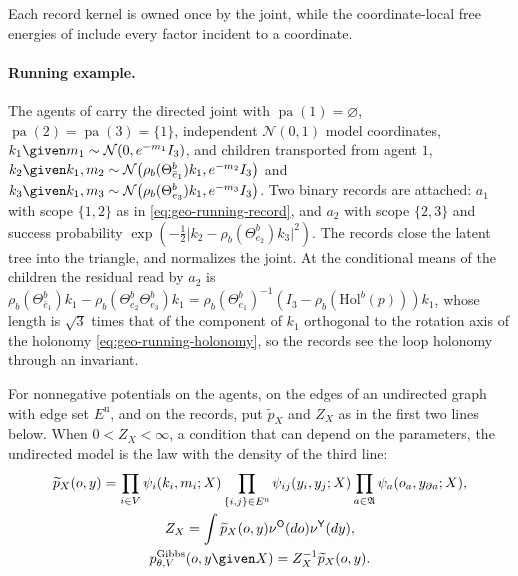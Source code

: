 Each record kernel is owned once by the joint, while the coordinate-local free energies of 
include every factor incident to a coordinate.

\paragraph{Running example.}
The agents of  carry the directed joint with
$\operatorname{pa}(1)=\varnothing$, $\operatorname{pa}(2)=\operatorname{pa}(3)=\{1\}$, independent
$\mathcal N(0,1)$ model coordinates, $k_1\given m_1\sim\mathcal N(0,e^{-m_1}I_3)$, and children
transported from agent $1$,
$k_2\given k_1,m_2\sim\mathcal N\bigl(\rho_b(\Theta^b_{\bar e_1})k_1,e^{-m_2}I_3\bigr)$ and
$k_3\given k_1,m_3\sim\mathcal N\bigl(\rho_b(\Theta^b_{e_3})k_1,e^{-m_3}I_3\bigr)$. Two binary records are
attached: $a_1$ with scope $\{1,2\}$ as in \eqref{eq:geo-running-record}, and $a_2$ with scope $\{2,3\}$
and success probability $\exp(-\tfrac12\lvert k_2-\rho_b(\Theta^b_{e_2})k_3\rvert^2)$. The records close the
latent tree into the triangle, and  normalizes the joint.
At the conditional means of the children the residual read by $a_2$ is
$\rho_b(\Theta^b_{\bar e_1})k_1-\rho_b(\Theta^b_{e_2}\Theta^b_{e_3})k_1
=\rho_b(\Theta^b_{e_1})^{-1}(I_3-\rho_b(\mathrm{Hol}^b(p)))k_1$, whose length is $\sqrt3$ times that of
the component of $k_1$ orthogonal to the rotation axis of the holonomy \eqref{eq:geo-running-holonomy},
so the records see the loop holonomy through an invariant.

For nonnegative potentials on the agents, on the edges of an undirected graph with edge set
$E^{\mathrm u}$, and on the records, put $\widetilde p_X$ and $Z_X$ as in the first two lines below.
When $0<Z_X<\infty$, a condition that can depend on the parameters, the undirected model is the law with
the density of the third line:
\begin{gather}
\widetilde p_X(o,y)
=\prod_{i\in V}\psi_i(k_i,m_i;X)
\prod_{\{i,j\}\in E^{\mathrm u}}\psi_{ij}(y_i,y_j;X)
\prod_{a\in\mathfrak A}\psi_a(o_a,y_{\partial a};X),
\label{eq:gen-gibbs-potential}\\
Z_X
=\int\widetilde p_X(o,y)\nu^{\mathsf O}(do)\nu^{\mathsf Y}(dy),
\label{eq:gen-gibbs-partition}\\
p_{\theta,V}^{\mathrm{Gibbs}}(o,y\given X)=Z_X^{-1}\widetilde p_X(o,y).
\label{eq:gen-gibbs-density}
\end{gather}

